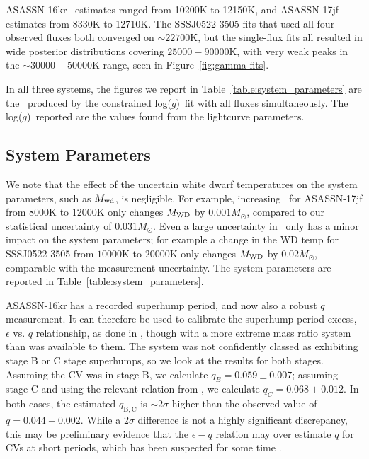 ASASSN-16kr \teff\ estimates ranged from 10200K to 12150K, and ASASSN-17jf estimates from 8330K to  12710K.
The SSSJ0522-3505 fits that used all four observed fluxes both converged on $\sim22700$K, but the single-flux fits all resulted in wide posterior distributions covering $25000 - 90000$K, with very weak peaks in the $\sim30000 - 50000$K range, seen in Figure~\ref{fig:gamma fits}.

In all three systems, the figures we report in Table~\ref{table:system_parameters} are the \teff\ produced by the constrained log($g$)\ fit with all fluxes simultaneously.
The log($g$)\ reported are the values found from the lightcurve parameters.


\subsection{System Parameters}
\label{sect:system parameters}

We note that the effect of the uncertain white dwarf temperatures on the system parameters, such as $M_{\rm wd}$, is negligible. For example, increasing \teff\ for ASASSN-17jf from 8000K to 12000K only changes $M_{\rm WD}$ by $0.001M_\odot$, compared to our statistical uncertainty of $0.031 M_\odot$. Even a large uncertainty in \teff\ only has a minor impact on the system parameters; for example a change in the WD temp for SSSJ0522-3505 from $10000$K to $20000$K only changes $M_{\rm WD}$ by $0.02 M_\odot$, comparable with the measurement uncertainty. The system parameters are reported in Table~\ref{table:system_parameters}.

ASASSN-16kr has a recorded superhump period, and now also a robust $q$ measurement. It can therefore be used to calibrate the superhump period excess, $\epsilon$ vs. $q$ relationship, as done in \citet{McAllister2019}, though with a more extreme mass ratio system than was available to them. The system was not confidently classed as exhibiting stage B or C stage superhumps, so we look at the results for both stages. Assuming the CV was in stage B, we calculate $q_B = 0.059\pm0.007$; assuming stage C and using the relevant relation from \citet{McAllister2019}, we calculate $q_C = 0.068\pm0.012$. In both cases, the estimated $q_\mathrm{B,C}$ is $\sim 2 \sigma$ higher than the observed value of $q = 0.044\pm0.002$. While a $2 \sigma$ difference is not a highly significant discrepancy, this may be preliminary evidence that the $\epsilon - q$ relation may over estimate $q$ for CVs at short periods, which has been suspected for some time \citep{pearson2007, knigge11}.

